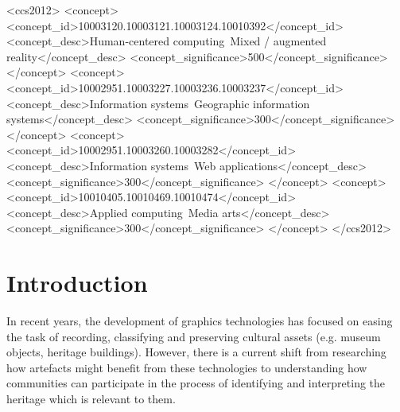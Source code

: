 \documentclass[acmlarge,screen,dvipsnames]{acmart}
\begin{document}
\begin{CCSXML} <ccs2012> <concept>
<concept_id>10003120.10003121.10003124.10010392</concept_id>
<concept_desc>Human-centered computing~Mixed / augmented
reality</concept_desc> <concept_significance>500</concept_significance>
</concept> <concept>
<concept_id>10002951.10003227.10003236.10003237</concept_id>
<concept_desc>Information systems~Geographic information
systems</concept_desc> <concept_significance>300</concept_significance>
</concept> <concept> <concept_id>10002951.10003260.10003282</concept_id>
<concept_desc>Information systems~Web applications</concept_desc>
<concept_significance>300</concept_significance> </concept> <concept>
<concept_id>10010405.10010469.10010474</concept_id> <concept_desc>Applied
computing~Media arts</concept_desc>
<concept_significance>300</concept_significance> </concept> </ccs2012>
\end{CCSXML}

  

\maketitle
\section{Introduction} In recent years, the development of graphics
technologies has focused on easing the task of recording, classifying and
preserving cultural assets (e.g. museum objects, heritage buildings). However,
there is a current shift from researching how artefacts might benefit from these technologies to understanding how communities can
participate in the process of identifying and interpreting the heritage which is relevant to them. 
\end{document}
